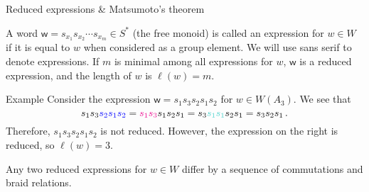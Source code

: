 \documentclass[9pt,handout]{beamer}
\newcommand{\supp}{\operatorname{supp}}
\newcommand{\w}{{\textsf{w}}}
\begin{document}
%    
%
%


\begin{frame}{Reduced expressions \& Matsumoto's theorem}

\begin{definition}
A word $\w = s_{x_1}s_{x_2}\cdots s_{x_m}\in S^{*}$ (the free monoid) is called an \alert{expression} for $w\in W$ if it is equal to $w$ when considered as a group element. We will use {\textsf{sans serif}} to denote expressions.
    If $m$ is minimal among all expressions for $w$, $\w$ is a \alert{reduced expression}, and the \alert{length} of $w$ is $\ell(w)=m$.
\end{definition}

\pause
    
\begin{block}{Example}
Consider the expression $\w = s_1s_3s_2s_1s_2$ for $w \in W(A_3)$. We see that
	$$s_1s_3{\color{blue}s_2s_1s_2}={\color{magenta}s_1s_3}s_1s_2s_1=s_3{\color{turq}s_1s_1}s_2s_1=s_3s_2s_1\,.$$
    Therefore, $s_1s_3s_2s_1s_2$ is not reduced. However, the expression on the right is reduced, so $\ell(w)=3$.
\end{block}

\pause

\begin{theorem}[Matsumoto]
Any two reduced expressions for $w\in W$ differ by a sequence of commutations and braid relations.
\end{theorem}
\end{frame}
\end{document}
